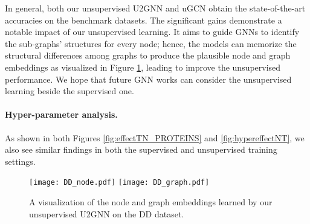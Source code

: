 \documentclass[twoside,leqno,twocolumn]{article}
\begin{document}
In general, both our unsupervised U2GNN and uGCN obtain the state-of-the-art accuracies on the benchmark datasets.
The significant gains demonstrate a notable impact of our unsupervised learning.
It aims to guide GNNs to identify the sub-graphs' structures for every node; hence, the models can memorize the structural differences among graphs to produce the plausible node and graph embeddings as visualized in Figure \ref{fig:visualunsupembeddings}, leading to improve the unsupervised performance.
We hope that future GNN works can consider the unsupervised learning beside the supervised one.

\paragraph{Hyper-parameter analysis.} As shown in both Figures \ref{fig:effectTN_PROTEINS} and \ref{fig:hypereffectNT}, we also see similar findings in both the supervised and unsupervised training settings.

\begin{figure}[ht]
\centering
    \texttt{[image: DD\_node.pdf]}
    \texttt{[image: DD\_graph.pdf]}
\caption[short]{A visualization of the node and graph embeddings learned by our unsupervised U2GNN on the DD dataset.}
\label{fig:visualunsupembeddings}
\end{figure}
\end{document}
